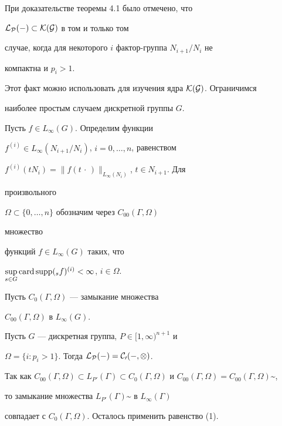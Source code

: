 При доказательстве теоремы 4.1 было отмечено, что


$\cal L_P(\Gamma)\subset\cal K(G)$ в том и только том


случае, когда для некоторого $i$ фактор-группа $N_{i+1}/N_i$ не


компактна и $p_i>1$.


Этот факт можно использовать для изучения ядра $\cal K(G)$. Ограничимся


наиболее простым случаем дискретной группы $G$.





Пусть $f\in L_\infty(G)$. Определим функции


$f^{(i)}\in L_\infty(N_{i+1}/N_i)$, $i=0,\dotsc,n$, равенством


$f^{(i)}(tN_i)=\|f(t\,\cdot\,)\|_{L_\infty(N_i)}$, $t\in N_{i+1}$. Для


произвольного


$\Omega\subset\{0,\dotsc,n\}$ обозначим через $C_{00}(\Gamma,\Omega)$


множество


функций $f\in L_\infty(G)$ таких, что


$\sup\limits_{s\in G}\operatorname{card}\operatorname{supp}({}_sf)^{(i)}<\infty$, $i\in \Omega$.


Пусть $C_0(\Gamma,\Omega)$ --- замыкание множества


$C_{00}(\Gamma,\Omega)$ в $L_\infty(G)$.





\begin{thms}


Пусть $G$ --- дискретная группа, $P\in[1,\infty)^{n+1}$ и


$\Omega=\{i:p_i>1\}$. Тогда $\cal L_P(\Gamma)=C_0(\Gamma,\Omega)$.


\end{thms}





\begin{pf}


Так как $C_{00}(\Gamma,\Omega)\subset L_{P'}(\Gamma)\subset


C_0(\Gamma,\Omega)$ и $C_{00}(\Gamma,\Omega)=


C_{00}(\Gamma,\Omega)\sptilde$,


то замыкание множества $L_{P'}(\Gamma)\sptilde$ в $L_\infty(\Gamma)$


совпадает с $C_0(\Gamma,\Omega)$. Осталось применить равенство (1).


\end{pf}





